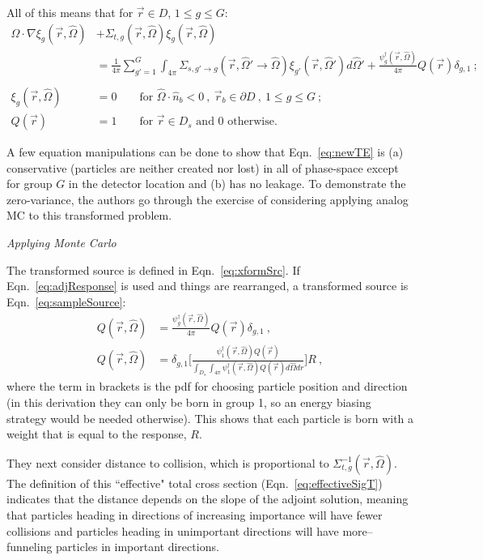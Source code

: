 \documentclass[12pt,twoside]{article}
\newcommand{\vOmega}{\ensuremath{\hat{\Omega}}}
\begin{document}
All of this means that for $\vec{r} \in D$, $1 \leq g \leq G$:
\begin{align}
  \vOmega \cdot \nabla \xi_g(\vec{r}, \vOmega) &+ 
   \Sigma_{t,g}(\vec{r}, \vOmega) \xi_g(\vec{r}, \vOmega) \nonumber \\
  &= \frac{1}{4 \pi} \sum_{g'=1}^{G} \int_{4 \pi} \Sigma_{s,g' \rightarrow g}(\vec{r}, \vOmega' \rightarrow \vOmega) \xi_{g'}(\vec{r}, \vOmega') d \vOmega' 
  + \frac{\psi_g^{\dagger}(\vec{r}, \vOmega)}{4 \pi} Q(\vec{r}) \delta_{g,1} \:; \label{eq:newTE}\\
  & \nonumber \\
  \xi_g(\vec{r}, \vOmega) &= 0 \qquad \text{for } \vOmega \cdot \hat{n}_b < 0 \:, \: \vec{r}_b \in \partial D \:, \: 1 \leq g \leq G \:; \\
  Q(\vec{r}) &= 1  \qquad \text{for } \vec{r} \in D_s \text{ and }0\text{ otherwise.}
\end{align}

A few equation manipulations can be done to show that Eqn.~\eqref{eq:newTE} is (a)  conservative (particles are neither created nor lost) in all of phase-space except for group $G$ in the detector location and (b) has no leakage. To demonstrate the zero-variance, the authors go through the exercise of considering applying analog MC to this transformed problem.

\vspace*{1em}
\noindent \textit{Applying Monte Carlo}

The transformed source is defined in Eqn.~\eqref{eq:xformSrc}. If Eqn.~\eqref{eq:adjResponse} is used and things are rearranged, a transformed source is Eqn.~\eqref{eq:sampleSource}:
\begin{align}
  Q(\vec{r}, \vOmega) &=  \frac{\psi^{\dagger}_{g}(\vec{r}, \vOmega)}{4 \pi} Q(\vec{r}) \delta_{g,1} \:,
  \label{eq:xformSrc} \\
%
  Q(\vec{r}, \vOmega) &= \delta_{g,1} \Biggl[\frac{\psi^{\dagger}_{1}(\vec{r}, \vOmega) Q(\vec{r})}{\int_{D_s} \int_{4\pi} \psi^{\dagger}_{1}(\vec{r}, \vOmega) Q(\vec{r}) d\vOmega dr} \Biggr] R \:, \label{eq:sampleSource}
\end{align}
where the term in brackets is the pdf for choosing particle position and direction (in this derivation they can only be born in group 1, so an energy biasing strategy would be needed otherwise). This shows that each particle is born with a weight that is equal to the response, $R$. 

They next consider distance to collision, which is proportional to $\Sigma_{t,g}^{-1}(\vec{r}, \vOmega)$. The definition of this ``effective" total cross section (Eqn.~\eqref{eq:effectiveSigT}) indicates that the distance depends on the slope of the adjoint solution, meaning that particles heading in directions of increasing importance will have fewer collisions and particles heading in unimportant directions will have more--funneling particles in important directions. 
\end{document}
